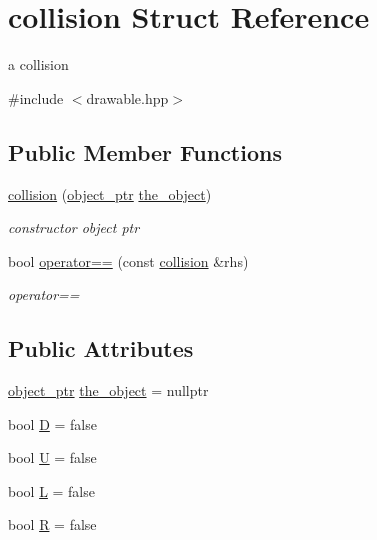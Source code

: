 \hypertarget{structcollision}{}\section{collision Struct Reference}
\label{structcollision}


a collision  




{\ttfamily \#include $<$drawable.\+hpp$>$}

\subsection*{Public Member Functions}
\begin{DoxyCompactItemize}
\item 
\hyperlink{structcollision_a8e4d3b4a9355c8946c0ad06ccc6e8d36}{collision} (\hyperlink{drawable_8hpp_aab5add95f06d2ba25dbfed8eb07274fa}{object\+\_\+ptr} \hyperlink{structcollision_a7ed36890448403a8a50bf90565255e42}{the\+\_\+object})
\begin{DoxyCompactList}\small\item\em constructor object ptr \end{DoxyCompactList}\item 
bool \hyperlink{structcollision_ab1721e643a7906b3e4319a86315fce1b}{operator==} (const \hyperlink{structcollision}{collision} \&rhs)
\begin{DoxyCompactList}\small\item\em operator== \end{DoxyCompactList}\end{DoxyCompactItemize}
\subsection*{Public Attributes}
\begin{DoxyCompactItemize}
\item 
\hyperlink{drawable_8hpp_aab5add95f06d2ba25dbfed8eb07274fa}{object\+\_\+ptr} \hyperlink{structcollision_a7ed36890448403a8a50bf90565255e42}{the\+\_\+object} = nullptr
\item 
bool \hyperlink{structcollision_a650a2bb40b437483c892b299c21920e8}{D} = false
\item 
bool \hyperlink{structcollision_a01f73e208a2d2c858a157ab895a58509}{U} = false
\item 
bool \hyperlink{structcollision_ae07e40f8555ca518bf68ab3d85fcdb8e}{L} = false
\item 
bool \hyperlink{structcollision_a89956863ae123b47eaf477b785a60a58}{R} = false
\end{DoxyCompactItemize}


